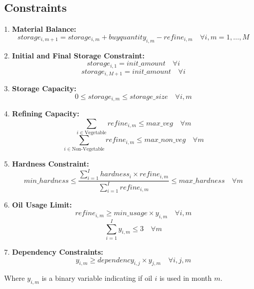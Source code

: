 \documentclass{article}
\begin{document}
\subsection*{Constraints}

1. \textbf{Material Balance:}
    \[
    storage_{i,m+1} = storage_{i,m} + buyquantity_{i,m} - refine_{i,m} \quad \forall i, m=1,\ldots,M
    \]

2. \textbf{Initial and Final Storage Constraint:}
    \[
    storage_{i,1} = init\_amount \quad \forall i
    \]
    \[
    storage_{i,M+1} = init\_amount \quad \forall i
    \]

3. \textbf{Storage Capacity:}
    \[
    0 \leq storage_{i,m} \leq storage\_size \quad \forall i, m
    \]

4. \textbf{Refining Capacity:}
    \[
    \sum_{i \in \text{Vegetable}} refine_{i,m} \leq max\_veg \quad \forall m
    \]
    \[
    \sum_{i \in \text{Non-Vegetable}} refine_{i,m} \leq max\_non\_veg \quad \forall m
    \]

5. \textbf{Hardness Constraint:}
    \[
    min\_hardness \leq \frac{\sum_{i=1}^{I} hardness_{i} \times refine_{i,m}}{\sum_{i=1}^{I} refine_{i,m}} \leq max\_hardness \quad \forall m
    \]

6. \textbf{Oil Usage Limit:}
    \[
    refine_{i,m} \geq min\_usage \times y_{i,m} \quad \forall i, m
    \]
    \[
    \sum_{i=1}^{I} y_{i,m} \leq 3 \quad \forall m
    \]

7. \textbf{Dependency Constraints:}
    \[
    y_{i,m} \geq dependency_{i,j} \times y_{j,m} \quad \forall i, j, m
    \]

Where $y_{i,m}$ is a binary variable indicating if oil $i$ is used in month $m$.
\end{document}
